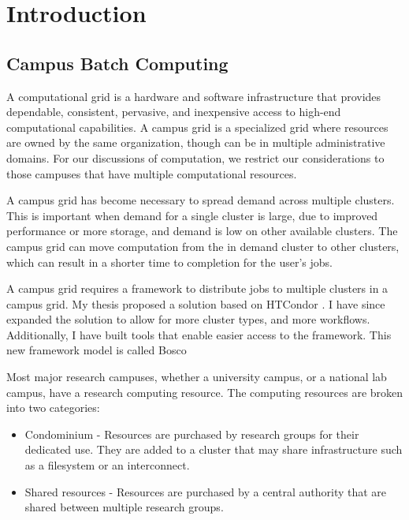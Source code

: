 \chapter{Introduction}

\section{Campus Batch Computing}

A computational grid is a hardware and software infrastructure that provides dependable, consistent, pervasive, and inexpensive access to high-end computational capabilities\cite{foster2004grid}.  A campus grid is a specialized grid where resources are owned by the same organization, though can be in multiple administrative domains.  For our discussions of computation, we restrict our considerations to those campuses that have multiple computational resources.

A campus grid has become necessary to spread demand across multiple clusters.  This is important when demand for a single cluster is large, due to improved performance or more storage, and demand is low on other available clusters.  The campus grid can move computation from the in demand cluster to other clusters, which can result in a shorter time to completion for the user's jobs.

A campus grid requires a framework to distribute jobs to multiple clusters in a campus grid.  My thesis \cite{weitzel2011campus} proposed a solution based on HTCondor \cite{litzkow1988condor}.  I have since expanded the solution to allow for more cluster types, and more workflows.  Additionally, I have built tools that enable easier access to the framework.  This new framework model is called Bosco \cite{}


Most major research campuses, whether a university campus, or a national lab campus, have a research computing resource.  The computing resources are broken into two categories:

\begin{itemize}

\item Condominium - Resources are purchased by research groups for their dedicated use.  They are added to a cluster that may share infrastructure such as a filesystem or an interconnect.
\item Shared resources -  Resources are purchased by a central authority that are shared between multiple research groups.

\end{itemize}





